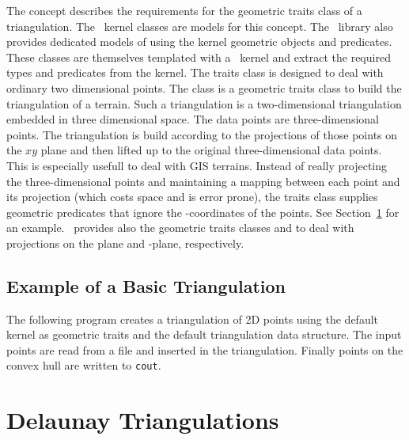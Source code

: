 The concept
  describes the requirements for the 
geometric traits class of a triangulation.
 The \cgal\  kernel classes 
are models for  this  concept.
The \cgal\  library also provides dedicated models
of  
using the kernel geometric objects and predicates.
These classes are themselves templated with a \cgal\  kernel
and extract the required types and predicates from the kernel.
The traits class 
is designed to deal with ordinary  two dimensional points.
The class  
is a geometric traits class to build the triangulation
of a terrain. Such a triangulation is a two-dimensional
triangulation embedded  in  three dimensional space.
The data points are three-dimensional points.
The triangulation is 
build according to  the projections of those points
on the $xy$ plane  and then lifted up to the original
three-dimensional data points.
This is especially usefull
to deal with GIS terrains.
Instead of really projecting the  three-dimensional points and
maintaining a mapping between each point and its projection
 (which costs space and is error prone),
the traits class  supplies geometric predicates that ignore the
-coordinates of the points.
See Section~\ref{Section_2D_Triangulations_Delaunay} for an example.
\cgal\ provides also the geometric traits classes
 and
 to
deal with projections on the
  plane  and  -plane,
respectively.

\subsection{Example of a Basic Triangulation}
\label{Subsection_2D_Triangulations_Basic_Example}

The following program  creates a  triangulation of 2D points
using the  default kernel 
as geometric traits and the default triangulation data structure.
 The input points are read from a file 
and inserted in the triangulation.
Finally points on the convex hull are written to {\tt cout}. 


\section{Delaunay Triangulations}
\label{Section_2D_Triangulations_Delaunay}

